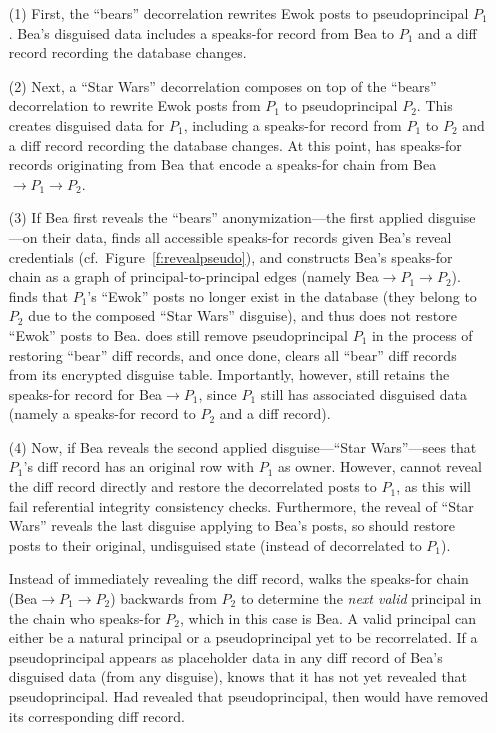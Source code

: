 %
\begin{enumerate}
    \item[(1)] First, the ``bears'' decorrelation rewrites Ewok posts to
        pseudoprincipal $P_1$. Bea's disguised data includes a speaks-for record
        from Bea to $P_1$ and a diff record recording the database changes.
%
\item[(2)] Next, a ``Star Wars'' decorrelation composes on top of the ``bears''
    decorrelation to rewrite Ewok posts from $P_1$ to pseudoprincipal $P_2$.
        This creates disguised data for $P_1$, including a speaks-for record
        from $P_1$ to $P_2$ and a diff record recording the database changes.
%
        At this point, \sys has speaks-for records originating from Bea that encode
        a speaks-for chain from Bea $\to P_1 \to P_2$.
%
\item[(3)] If Bea first reveals the ``bears'' anonymization---the first applied
disguise---on their data, \sys finds all accessible speaks-for records given
Bea's reveal credentials (cf.\ Figure~\ref{f:revealpseudo}), and constructs Bea's
speaks-for chain as a graph of principal-to-principal edges (namely Bea$\to
P_1\to P_2$).
%
\sys finds that $P_1$'s ``Ewok'' posts no longer exist in the database (they
        belong to $P_2$ due to the composed ``Star Wars'' disguise), and thus
        does not restore ``Ewok'' posts to Bea. \sys does still remove
        pseudoprincipal $P_1$ in the process of restoring ``bear'' diff records,
        and once done, clears all ``bear'' diff records from its encrypted
        disguise table. 
%
        Importantly, however, \sys still retains the speaks-for record for
        Bea$\to P_1$, since $P_1$ still has associated disguised data (namely a
        speaks-for record to $P_2$ and a diff record).
%
\item[(4)] Now, if Bea reveals the second applied disguise---``Star
    Wars''---\sys sees that $P_1$'s diff record has an original row with $P_1$ as
        owner. 
%
        However, \sys cannot reveal the diff record directly and restore the
        decorrelated posts to $P_1$, as this will fail referential integrity
        consistency checks. Furthermore, the reveal of ``Star Wars'' reveals the
        last disguise applying to Bea's posts, so \sys should restore posts to
        their original, undisguised state (instead of decorrelated to $P_1$).

        Instead of immediately revealing the diff record, \sys walks the
        speaks-for chain (Bea$\to P_1 \to P_2$) backwards from $P_2$ to
        determine the \emph{next valid} principal in the chain who speaks-for $P_2$,
        which in this case is Bea.
        A valid principal can either be a natural principal or a pseudoprincipal
        yet to be recorrelated. If a pseudoprincipal appears as placeholder data
        in any diff record of Bea's disguised data (from any disguise), \sys
        knows that it has not yet revealed that pseudoprincipal. Had \sys
        revealed that pseudoprincipal, then \sys would have removed its
        corresponding diff
        record.


\end{enumerate}
